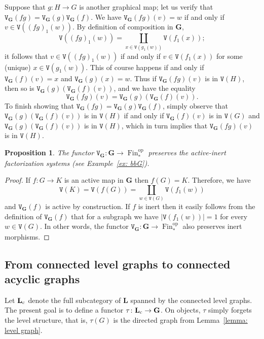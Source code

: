 \documentclass{amsart}
\numberwithin{theorem}{subsection}
\newtheorem{proposition}[theorem]{Proposition}
\theoremstyle{definition}
\providecommand{\op}{\mathrm{op}}
\newcommand{\finset}{\operatorname{Fin}}
\newcommand{\pfinset}{\finset_*}
\newcommand{\name}[1]{\ensuremath{\text{\textup{#1}}}}
\newcommand{\levelg}{\mathbf{L}}
\newcommand{\levelgconn}{\levelg_{\name{c}}}
\newcommand{\bbY}{\mathbf{G}}
\newcommand{\vertex}{\mathtt{V}}
\begin{document}
Suppose that $g\colon H \to G$ is another graphical map; let us verify that $\vertex_\bbY(fg) = \vertex_\bbY(g) \vertex_\bbY(f)$.
We have $\vertex_\bbY(fg)(v) = w$ if and only if $v \in \vertex((fg)_1(w))$.
By definition of composition in $\bbY$,
\[
	\vertex((fg)_1(w)) = \coprod_{x \in \vertex(g_1(w))} \vertex(f_1(x));
\]
it follows that $v \in \vertex((fg)_1(w))$ if and only if $v\in \vertex(f_1(x))$ for some (unique) $x \in \vertex(g_1(w))$.
This of course happens if and only if $\vertex_\bbY(f)(v) = x$ and $\vertex_\bbY(g)(x) = w$.
Thus if $\vertex_\bbY(fg)(v)$ is in $\vertex(H)$, then so is $\vertex_\bbY(g)(\vertex_\bbY(f)(v))$, and we have the equality
\[
	\vertex_\bbY(fg)(v) = \vertex_\bbY(g)(\vertex_\bbY(f)(v)).
\]
To finish showing that $\vertex_\bbY(fg) = \vertex_\bbY(g)\vertex_\bbY(f)$, simply observe that $\vertex_\bbY(g)(\vertex_\bbY(f)(v))$ is in $\vertex(H)$ if and only if $\vertex_\bbY(f)(v)$ is in $\vertex(G)$ and $\vertex_\bbY(g)(\vertex_\bbY(f)(v))$ is in $\vertex(H)$, which in turn implies that $\vertex_\bbY(fg)(v)$ is in $\vertex(H)$.

\begin{proposition}\label{prop active inert bbY}
	The functor $\vertex_\bbY\colon \bbY\to \pfinset^\op$ preserves the active-inert factorization systems (see Example~\ref{ex: bbG}).
\end{proposition}
\begin{proof}
	If $f\colon G\to K$ is an active map in $\bbY$ then $f(G) = K$.
	Therefore, we have
	\[
		\vertex(K) = \vertex(f(G)) = \coprod_{w\in \vertex(G)} \vertex(f_1(w))
	\]
	and $\vertex_\bbY(f)$ is active by construction.
	 If $f$ is inert then it easily follows from the definition of $\vertex_\bbY(f)$ that for a subgraph we have $|\vertex(f_1(w))| = 1$ for every $w\in \vertex(G)$.
	In other words, the functor $\vertex_\bbY\colon \bbY\to \pfinset^\op$ also preserves inert morphisms.
\end{proof}

\subsection{From connected level graphs to connected acyclic graphs}\label{section level to acyclic}

Let $\levelgconn$ denote the full subcategory of $\levelg$ spanned by the connected level graphs.
The present goal is to define a functor $\tau\colon \levelgconn \to \bbY$.
On objects, $\tau$ simply forgets the level structure, that is, $\tau(G)$ is the directed graph from Lemma~\ref{lemma: level graph}.
\end{document}
